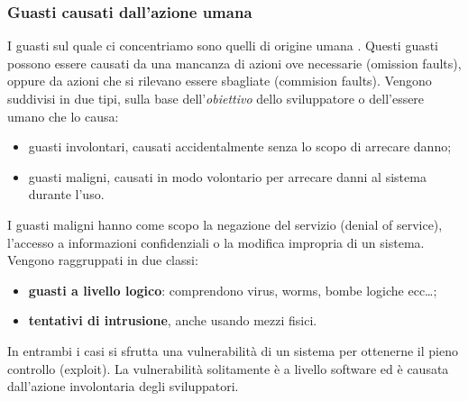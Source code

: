  \subsubsection{Guasti causati dall'azione umana}
 I guasti sul quale ci concentriamo sono quelli di origine umana . Questi guasti possono essere causati da una mancanza di 
 azioni ove necessarie (omission faults), oppure da azioni che si rilevano essere sbagliate (commision faults). Vengono
 suddivisi in due tipi, sulla base dell'\emph{obiettivo} dello sviluppatore o dell'essere umano che lo causa:
 \begin{itemize}
     \item guasti involontari, causati  accidentalmente senza lo scopo di arrecare danno;
     \item guasti maligni, causati in modo volontario per arrecare danni al sistema durante l'uso.
 \end{itemize}
 I guasti maligni hanno  come scopo la negazione del servizio (denial of service), l'accesso a informazioni confidenziali
 o la modifica impropria di un sistema.
 Vengono raggruppati in due classi:
 \begin{itemize}
     \item \textbf{guasti a livello logico}: comprendono virus, worms, bombe logiche ecc\dots;
     \item \textbf{tentativi di intrusione}, anche usando mezzi fisici.
 \end{itemize}
 In entrambi i casi si sfrutta una vulnerabilità di un sistema per ottenerne il pieno controllo (exploit).
 La vulnerabilità solitamente è a livello software ed è causata dall'azione involontaria degli sviluppatori.

